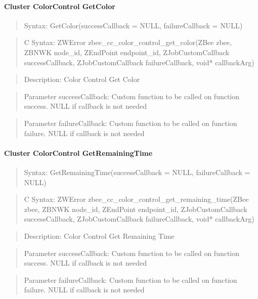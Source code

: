 \paragraph{Cluster ColorControl GetColor}
\begin{quote}Syntax: GetColor(successCallback = NULL, failureCallback = NULL)\end{quote}
\begin{quote}C Syntax: ZWError zbee\_cc\_color\_control\_get\_color(ZBee zbee, ZBNWK node\_id, ZEndPoint endpoint\_id, ZJobCustomCallback successCallback, ZJobCustomCallback failureCallback, void* callbackArg)\end{quote}
\begin{quote}Description: Color Control Get Color\end{quote}
\begin{quote}Parameter successCallback: Custom function to be called on function success. NULL if callback is not needed\end{quote}
\begin{quote}Parameter failureCallback: Custom function to be called on function failure. NULL if callback is not needed\end{quote}


\paragraph{Cluster ColorControl GetRemainingTime}
\begin{quote}Syntax: GetRemainingTime(successCallback = NULL, failureCallback = NULL)\end{quote}
\begin{quote}C Syntax: ZWError zbee\_cc\_color\_control\_get\_remaining\_time(ZBee zbee, ZBNWK node\_id, ZEndPoint endpoint\_id, ZJobCustomCallback successCallback, ZJobCustomCallback failureCallback, void* callbackArg)\end{quote}
\begin{quote}Description: Color Control Get Remaining Time\end{quote}
\begin{quote}Parameter successCallback: Custom function to be called on function success. NULL if callback is not needed\end{quote}
\begin{quote}Parameter failureCallback: Custom function to be called on function failure. NULL if callback is not needed\end{quote}



